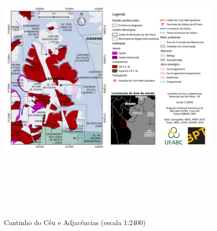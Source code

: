 	\begin{landscape}
		\begin{figure}
			\centering
			\caption{Cantinho do Céu e Adjacências (escala 1:2400)}
			\includegraphics[height=14cm,keepaspectratio]{img/mapa_1-24000}
			\label{fig:mapa_1-24000}
		\end{figure}
	\end{landscape}
	
